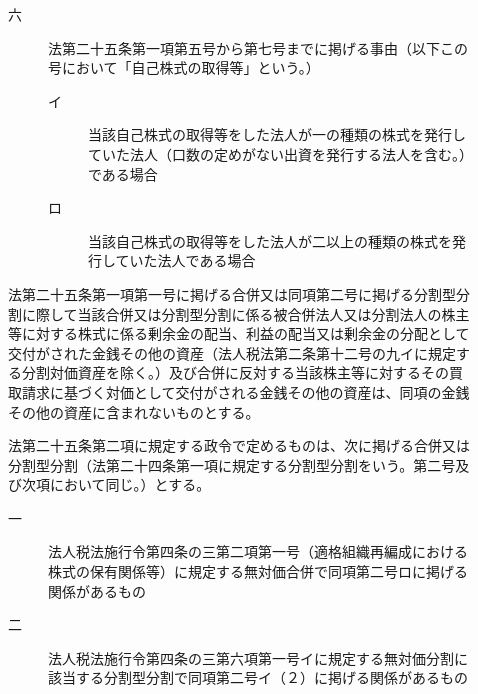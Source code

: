 \documentclass[twocolumn,a4j,10pt]{ltjtarticle}
\begin{document}
\begin{description}
\begin{description}
\begin{description}
\end{description}
\item[六]法第二十五条第一項第五号から第七号までに掲げる事由（以下この号において「自己株式の取得等」という。）
\begin{description}
\item[イ]当該自己株式の取得等をした法人が一の種類の株式を発行していた法人（口数の定めがない出資を発行する法人を含む。）である場合
\item[ロ]当該自己株式の取得等をした法人が二以上の種類の株式を発行していた法人である場合
\end{description}
\end{description}
\item[\rensuji{3}]法第二十五条第一項第一号に掲げる合併又は同項第二号に掲げる分割型分割に際して当該合併又は分割型分割に係る被合併法人又は分割法人の株主等に対する株式に係る剰余金の配当、利益の配当又は剰余金の分配として交付がされた金銭その他の資産（法人税法第二条第十二号の九イに規定する分割対価資産を除く。）及び合併に反対する当該株主等に対するその買取請求に基づく対価として交付がされる金銭その他の資産は、同項の金銭その他の資産に含まれないものとする。
\item[\rensuji{4}]法第二十五条第二項に規定する政令で定めるものは、次に掲げる合併又は分割型分割（法第二十四条第一項に規定する分割型分割をいう。第二号及び次項において同じ。）とする。
\begin{description}
\item[一]法人税法施行令第四条の三第二項第一号（適格組織再編成における株式の保有関係等）に規定する無対価合併で同項第二号ロに掲げる関係があるもの
\item[二]法人税法施行令第四条の三第六項第一号イに規定する無対価分割に該当する分割型分割で同項第二号イ（２）に掲げる関係があるもの
\end{description}

\end{description}
\end{document}
